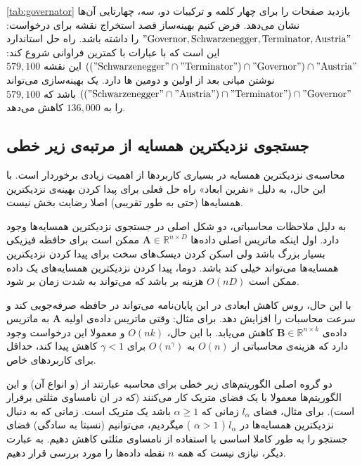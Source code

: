 \autoref{tab:governator}
بازدید صفحات را برای چهار کلمه و ترکیبات دو، سه، چهارتایی آن‌ها نشان می‌دهد. فرض کنیم بهینه‌ساز قصد استخراج نقشه برای درخواست:
$"\mathrm{Governor, Schwarzenegger, Terminator, Austria}"$
را داشته باشد. راه حل استاندارد این است که با عبارات با کمترین فراوانی شروع کند:
$(("\mathrm{Schwarzenegger}" \cap "\mathrm{Terminator}") \cap "\mathrm{Governor}") \cap "\mathrm{Austria}"$
این نقشه 
$579,100$
نوشتن میانی بعد از اولین و دومین 
ها دارد. یک بهینه‌سازی می‌تواند 
$(("\mathrm{Schwarzenegger}" \cap "\mathrm{Austria}") \cap "\mathrm{Terminator}") \cap "\mathrm{Governor}"$
باشد که 
$579,100$
را به 
$136,000$
کاهش می‌دهد.


\subsection{
جستجوی نزدیکترین همسایه از مرتبه‌ی زیر خطی
}
محاسبه‌ی نزدیکترین همسایه در بسیاری کاربردها از اهمیت زیادی برخوردار است. با این حال، به دلیل «نفرین ابعاد»%
راه حل فعلی برای پیدا کردن بهینه‌ی نزدیکترین همسایه‌ها (حتی به طور تقریبی) اصلا رضایت بخش نیست.
\cite{litez88, litez100}

به دلیل ملاحظات محاسباتی، دو شکل اصلی در جستجوی نزدیکترین همسایه‌ها وجود دارد. اول اینکه ماتریس اصلی داده‌ها 
$\mathbf{A} \in \mathbb{R}^{n \times D}$
ممکن است برای حافظه فیزیکی بسیار بزرگ باشد ولی اسکن کردن دیسک‌های سخت برای پیدا کردن نزدیکترین همسایه‌ها می‌تواند خیلی کند باشد. دوما، پیدا کردن نزدیکترین همسایه‌های یک داده ممکن است
$O(nD)$
هزینه بر باشد که می‌تواند به شدت زمان بر شود.

با این حال، روس کاهش ابعادی در این پایان‌نامه می‌تواند در حافظه صرفه‌جویی کند و سرعت محاسبات را افزایش دهد. برای مثال: وقتی ماتریس داده‌ی اولیه 
$\mathbf{A}$
به ماتریس داده‌ی 
$\mathbf{B} \in \mathbb{R}^{n \times k}$
کاهش می‌یابد. با این حال، 
$O(nk)$
و معمولا این درخواست وجود دارد که هزینه‌ی محاسباتی از 
$O(n)$
به 
$O(n^\gamma)$
برای 
$\gamma < 1$
کاهش پیدا کند، حداقل برای کاربردهای خاص.

دو گروه اصلی الگوریتم‌های زیر خطی برای محاسبه عبارتند از 
(و انواع آن)
\cite{litez79, litez80}
و 
\cite{litez15, litez56, litez100}
این الگوریتم‌ها معمولا با یک فضای متریک کار می‌کنند (که در ان نامساوی مثلثی برقرار است). برای مثال، فضای 
$l_\alpha$
زمانی که 
$\alpha \geq 1$
باشد یک متریک است. زمانی که به دنبال نزدیکترین‌ همسایه‌ها در 
$l_\alpha$
(
$\alpha > 1$
) میگردیم، می‌توانیم (نسبتا به سادگی) فضای جستجو را به طور کاملا اساسی با استفاده از نامساوی مثلثی کاهش دهیم. به عبارت دیگر، نیازی نیست که همه 
$n$
نقطه داده‌ها را مورد بررسی قرار دهیم.


